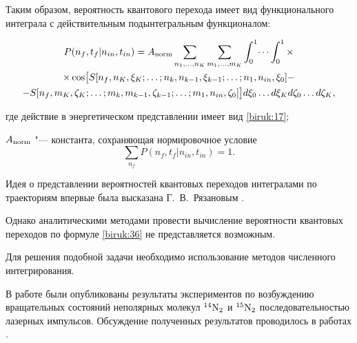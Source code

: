 Таким образом, вероятность квантового перехода имеет вид функционального интеграла с действительным подынтегральным функционалом:

\begin{multline}

\label{biruk:36}

P(n_f,t_f|n_{in},t_{in})=A_{\rm norm}\sum\limits_{n_{1},\dots,n_{K}} \sum\limits_{m_{1},\dots,m_{K}} \int _{0}^{1} \dots \int _{0}^{1}

\times

\\

\times

\cos\bigl[S[n_f,n_{K},\xi_K;\dots ;n_k,n_{k-1},\xi_{k-1};\dots ;n_{1},n_{in},\xi_0]

-

\\

-

S[n_f,m_{K},\zeta_K;\dots ;m_k,m_{k-1},\zeta_{k-1};\dots ;m_{1},n_{in},\zeta_0] \bigr]d\xi_0\dots d\xi_K d\zeta_0\dots d\zeta_K,

\end{multline}

где действие в энергетическом представлении имеет вид \eqref{biruk:17}; 

$A_{\rm norm}$ "--- константа, сохраняющая нормировочное условие $$\sum\limits_{n_f} P(n_f,t_f|n_{in},t_{in})=1.$$ 



Идея о представлении вероятностей квантовых переходов интегралами по траекториям впервые была высказана Г.~В.~Рязановым  \cite{biruk:Ryazanov}. 

Однако аналитическими методами провести вычисление вероятности квантовых переходов по формуле \eqref{biruk:36} не представляется возможным. 

Для решения подобной задачи необходимо использование методов численного интегрирования.



\smallskip




В работе \cite{biruk:Zhdanovich_12} были опубликованы результаты экспериментов по возбуждению вращательных состояний неполярных молекул $^{14}\rm N_{2}$ и $^{15}\rm N_{2}$ последовательностью лазерных импульсов. Обсуждение полученных результатов проводилось в работах \cite{biruk:Floss_13, biruk:Floss_12}.



